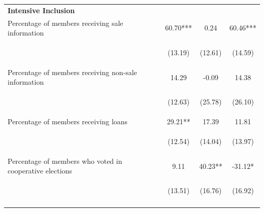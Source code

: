 \documentclass[11pt]{article}
\begin{document}
\begin{table}[H]
{\begin{tabularx}{1.1\linewidth}{lccc}
 
 \textbf{Intensive Inclusion} & & & \\
\noalign{\smallskip}Percentage of members receiving sale information & 60.70*** & 0.24 & 60.46***\\
 & \begin{footnotesize}(13.19)\end{footnotesize} & \begin{footnotesize}(12.61)\end{footnotesize} & \begin{footnotesize}(14.59)\end{footnotesize}\\
\noalign{\smallskip}Percentage of members receiving non-sale information & 14.29 & -0.09 & 14.38\\
 & \begin{footnotesize}(12.63)\end{footnotesize} & \begin{footnotesize}(25.78)\end{footnotesize} & \begin{footnotesize}(26.10)\end{footnotesize}\\
\noalign{\smallskip}Percentage of members receiving loans & 29.21** & 17.39 & 11.81\\
 & \begin{footnotesize}(12.54)\end{footnotesize} & \begin{footnotesize}(14.04)\end{footnotesize} & \begin{footnotesize}(13.97)\end{footnotesize}\\
\noalign{\smallskip}Percentage of members who voted in cooperative elections & 9.11 & 40.23** & -31.12*\\
 & \begin{footnotesize}(13.51)\end{footnotesize} & \begin{footnotesize}(16.76)\end{footnotesize} & \begin{footnotesize}(16.92)\end{footnotesize}\\
 \noalign{\smallskip}\hline
  \end{tabularx}}
\end{table}
\doublespacing
\end{document}
